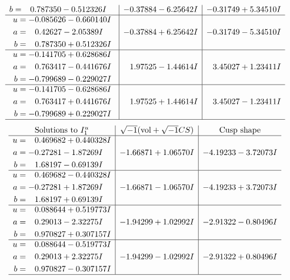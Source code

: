 \documentclass[1p]{elsarticle_modified}
\theoremstyle{definition}
\newcommand{\I}{\sqrt{-1}}
\begin{document}
$$\begin{array}{c|c|c}
\begin{aligned}
b &= \phantom{-}0.787350 - 0.512326 I\end{aligned}
 & -0.37884 - 6.25642 I & -0.31749 + 5.34510 I \\ \hline\begin{aligned}
u &= -0.085626 - 0.660140 I \\
a &= \phantom{-}0.42627 - 2.05389 I \\
b &= \phantom{-}0.787350 + 0.512326 I\end{aligned}
 & -0.37884 + 6.25642 I & -0.31749 - 5.34510 I \\ \hline\begin{aligned}
u &= -0.141705 + 0.628686 I \\
a &= \phantom{-}0.763417 - 0.441676 I \\
b &= -0.799689 - 0.229027 I\end{aligned}
 & \phantom{-}1.97525 - 1.44614 I & \phantom{-}3.45027 + 1.23411 I \\ \hline\begin{aligned}
u &= -0.141705 - 0.628686 I \\
a &= \phantom{-}0.763417 + 0.441676 I \\
b &= -0.799689 + 0.229027 I\end{aligned}
 & \phantom{-}1.97525 + 1.44614 I & \phantom{-}3.45027 - 1.23411 I\\
 \hline 
 \end{array}$$\newpage$$\begin{array}{c|c|c}  
\text{Solutions to }I^u_{1}& \I (\text{vol} + \sqrt{-1}CS) & \text{Cusp shape}\\
 \hline 
\begin{aligned}
u &= \phantom{-}0.469682 + 0.440328 I \\
a &= -0.27281 - 1.87269 I \\
b &= \phantom{-}1.68197 - 0.69139 I\end{aligned}
 & -1.66871 + 1.06570 I & -4.19233 - 3.72073 I \\ \hline\begin{aligned}
u &= \phantom{-}0.469682 - 0.440328 I \\
a &= -0.27281 + 1.87269 I \\
b &= \phantom{-}1.68197 + 0.69139 I\end{aligned}
 & -1.66871 - 1.06570 I & -4.19233 + 3.72073 I \\ \hline\begin{aligned}
u &= \phantom{-}0.088644 + 0.519773 I \\
a &= \phantom{-}0.29013 - 2.32275 I \\
b &= \phantom{-}0.970827 + 0.307157 I\end{aligned}
 & -1.94299 + 1.02992 I & -2.91322 - 0.80496 I \\ \hline\begin{aligned}
u &= \phantom{-}0.088644 - 0.519773 I \\
a &= \phantom{-}0.29013 + 2.32275 I \\
b &= \phantom{-}0.970827 - 0.307157 I\end{aligned}
 & -1.94299 - 1.02992 I & -2.91322 + 0.80496 I\\
 \hline 
 \end{array}$$\newpage\newpage\renewcommand{\arraystretch}{1}
\end{document}
